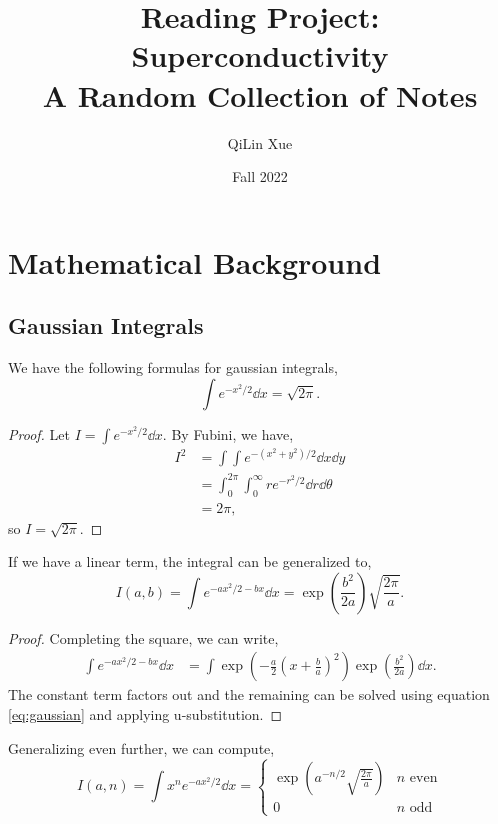 \documentclass{article}
\title{Reading Project: Superconductivity \\ A Random Collection of Notes}
\author{QiLin Xue}
\date{Fall 2022}
\numberwithin{equation}{section}
\begin{document}
\maketitle
\tableofcontents
\newpage
\section{Mathematical Background}
\subsection{Gaussian Integrals}
We have the following formulas for gaussian integrals,
\begin{equation}
    \label{eq:gaussian}
    \boxed{\int e^{-x^2/2} \dd{x} = \sqrt{2\pi}}.
\end{equation}
\begin{proof}
    Let $I = \int e^{-x^2/2} \dd{x}.$ By Fubini, we have,
    \begin{align}
        I^2 &= \int\int e^{-(x^2+y^2)/2}\dd{x}\dd{y} \\ 
        &= \int_0^{2\pi}\int_{0}^{\infty} r e^{-r^2/2}\dd{r}\dd{\theta} \\ 
        &= 2\pi,
    \end{align}
    so $I = \sqrt{2\pi}.$
\end{proof}
If we have a linear term, the integral can be generalized to,
\begin{equation}
    \boxed{I(a,b) = \int e^{-ax^2/2-bx}\dd{x} =\exp\left(\frac{b^2}{2a}\right)\sqrt{\frac{2\pi}{a}}}.
\end{equation}
\begin{proof}
    Completing the square, we can write,
    \begin{align}
        \int e^{-ax^2/2-bx}\dd{x} &= \int \exp\left(-\frac{a}{2}\left(x+\frac{b}{a}\right)^2\right)\exp\left(\frac{b^2}{2a}\right) \dd{x}.
    \end{align}
    The constant term factors out and the remaining can be solved using equation \ref{eq:gaussian} and applying u-substitution. 
\end{proof}
Generalizing even further, we can compute,
\begin{equation}
    \boxed{I(a,n) = \int x^n e^{-ax^2/2}\dd{x} = \begin{cases}
        \exp\left(a^{-n/2}\sqrt{\frac{2\pi}{a}}\right) & n\text{ even} \\ 
        0 & n\text{ odd}
    \end{cases}}
\end{equation}
\end{document}
